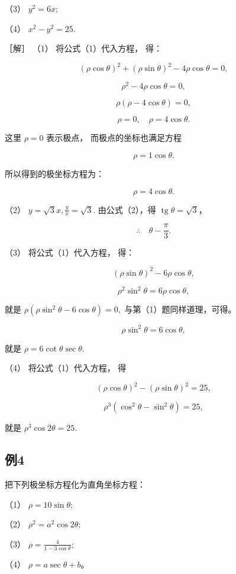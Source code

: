 （3） \(y^{2}=6x;\)

（4） \(x^{2} - y^{2} = 25.\)

［解］ （1） 将公式（1）代入方程， 得：

\[
(\rho \cos \theta) ^ {2} + (\rho \sin \theta) ^ {2} - 4 \rho \cos \theta = 0,
\]

\[
\rho^{2} - 4 \rho \cos \theta = 0,
\]

\[
\rho (\rho - 4 \cos \theta) = 0,
\]

\[
\rho = 0, \quad \rho = 4 \cos \theta.
\]

这里 \(\rho=0\) 表示极点， 而极点的坐标也满足方程

\[
\rho = 1 \cos \theta.
\]

所以得到的极坐标方程为：

\[
\rho = 4 \cos \theta.
\]

（2） \(y = \sqrt{3} x, \frac{y}{x} = \sqrt{3}.\) 由公式（2），得
\(\operatorname{tg} \theta = \sqrt{3}\)，

\[
\therefore \quad \theta - \frac {\pi}{3}.
\]

（3） 将公式（1）代入方程， 得：

\[
(\rho \sin \theta) ^ {2} - 6 \rho \cos \theta,
\]

\[
\rho^{2} \sin^{2} \theta = 6 \rho \cos \theta,
\]

就是 \(\rho (\rho \sin^2\theta -6\cos \theta) = 0,\)
与第（1）题同样道理，可得。

\[
\rho \sin^{2} \theta = 6 \cos \theta,
\]

就是 \(\rho = 6\cot \theta \sec \theta .\)

（4） 将公式（1）代入方程， 得

\[
(\rho \cos \theta) ^ {2} - (\rho \sin \theta) ^ {2} = 25,
\]

\[
\rho^{3} (\cos^{2} \theta - \sin^{2} \theta) = 25,
\]

就是 \(\rho^3\cos 2\theta = 25.\)

\subsection{例4}\label{ux4f8b4-24}

把下列极坐标方程化为直角坐标方程：

（1） \(\rho = 10\sin \theta ;\)

（2） \(\rho^2 = a^2\cos 2\theta ;\)

（3） \(\rho = \frac{4}{1 - 3\cos\theta};\)

（4） \(\rho = a\sec \theta + b\)。

